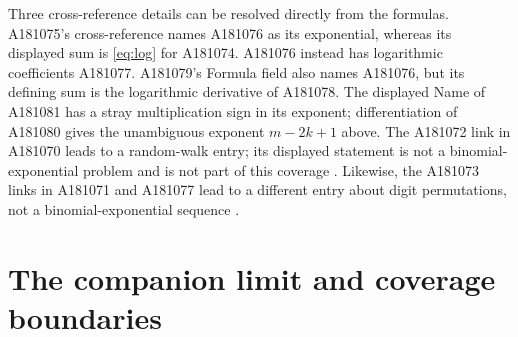 \documentclass[11pt]{article}
\begin{document}
Three cross-reference details can be resolved directly from the formulas.
A181075's cross-reference names A181076 as its exponential, whereas its
displayed sum is \eqref{eq:log} for A181074. A181076 instead has logarithmic
coefficients A181077. A181079's Formula field also names A181076,
but its defining sum is the logarithmic derivative of A181078.
The displayed Name of A181081 has a stray multiplication
sign in its exponent; differentiation of A181080 gives the unambiguous exponent
\(m-2k+1\) above. The A181072 link in A181070 leads to a random-walk entry;
its displayed statement is not a binomial-exponential problem and is not
part of this coverage \cite{walk}. Likewise, the A181073 links in A181071
and A181077 lead to a different entry about digit permutations, not a
binomial-exponential sequence \cite{digits}.

\section{The companion limit and coverage boundaries}
\end{document}
